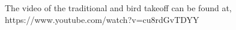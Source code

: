\documentclass[applsci,article,accept,moreauthors,pdftex]{Definitions/mdpi}
\begin{document}
			
			
			
			
The video of the traditional and bird takeoff can be found at, https://www.youtube.com/watch?v=cu8rdGvTDYY
			
\end{document}
